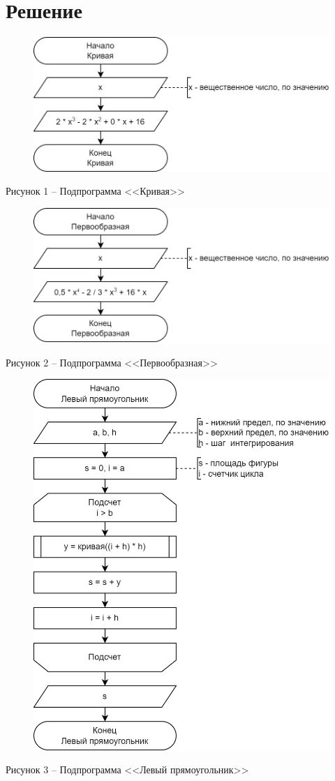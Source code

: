 \documentclass[a4paper,14pt]{extarticle}
\begin{document}
  \section*{Решение}
  \begin{figure}[h]
    \centering
    \includegraphics[width=0.6\linewidth]{images/s-1}
  \end{figure}
  \begin{center}
    Рисунок 1 – Подпрограмма <<Кривая>>
  \end{center}

  \pagebreak
  \begin{figure}[h]
    \centering
    \includegraphics[width=0.6\linewidth]{images/s-2}
  \end{figure}
  \begin{center}
    Рисунок 2 – Подпрограмма <<Первообразная>>
  \end{center}

  \begin{figure}[h]
    \centering
    \includegraphics[width=0.6\linewidth]{images/s-4}
  \end{figure}
  \begin{center}
    Рисунок 3 – Подпрограмма <<Левый прямоугольник>>
  \end{center}
\end{document}
